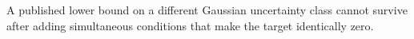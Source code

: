 A published lower bound on a different Gaussian uncertainty class cannot survive after adding simultaneous conditions that make the target identically zero.